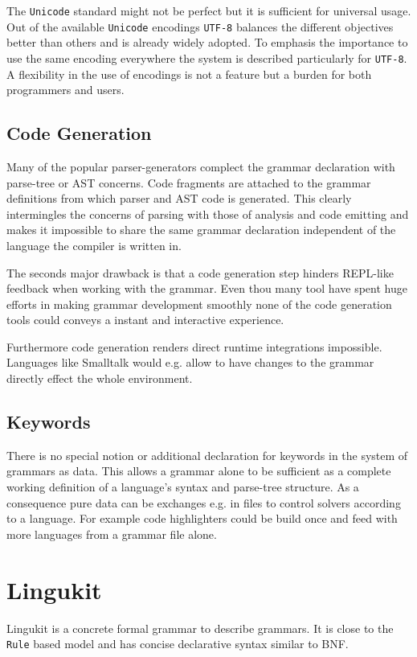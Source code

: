 \documentclass[10pt,a4paper]{article}
\begin{document}
The \texttt{Unicode} standard might not be perfect but it is sufficient for universal usage. Out of the available \texttt{Unicode} encodings \texttt{UTF-8} balances the different objectives better than others and is already widely adopted. To emphasis the importance to use the same encoding everywhere the system is described particularly for \texttt{UTF-8}. A flexibility in the use of encodings is not a feature but a burden for both programmers and users.

\subsection{Code Generation}
Many of the popular parser-generators complect the grammar declaration with parse-tree or AST concerns. Code fragments are attached to the grammar definitions from which parser and AST code is generated. This clearly intermingles the concerns of parsing with those of analysis and code emitting and makes it impossible to share the same grammar declaration independent of the language the compiler is written in. 

The seconds major drawback is that a code generation step hinders  REPL-like feedback when working with the grammar. Even thou many tool have spent huge efforts in making grammar development smoothly none of the code generation tools could conveys a instant and interactive experience. 

Furthermore code generation renders direct runtime integrations impossible. Languages like Smalltalk would e.g. allow to have changes to the grammar directly effect the whole environment.

\subsection{Keywords}
There is no special notion or additional declaration for keywords in the system of grammars as data. This allows a grammar alone to be sufficient as a complete working definition of a language's syntax and parse-tree structure. As a consequence pure data can be exchanges e.g. in files to control solvers according to a language. For example code highlighters could be build once and feed with more languages from a grammar file alone.

\section{Lingukit}
Lingukit is a concrete formal grammar to describe grammars. It is close to the \texttt{Rule} based model and has concise declarative syntax similar to BNF.
\end{document}
